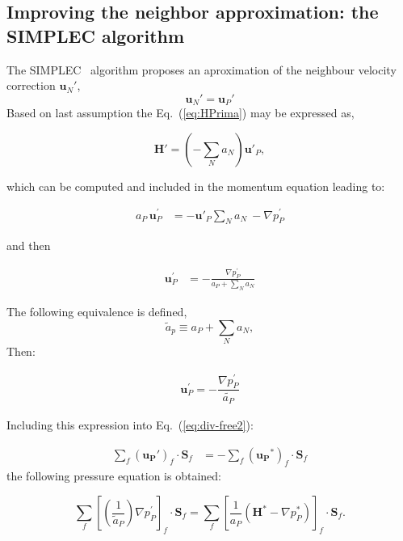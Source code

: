 \documentclass[final,3p,times,10pt,onecolumn]{myElsarticle}
\numberwithin{equation}{section}
\begin{document}
\subsection{Improving the neighbor approximation: the SIMPLEC algorithm}
The SIMPLEC~\cite{vanDoormal} algorithm proposes an aproximation of the neighbour velocity correction $\boldsymbol{u}_N'$,
\begin{equation}
\label{Eq:simplecAproximation}
\boldsymbol{u}_N'
=
\boldsymbol{u}_P'
\end{equation}
Based on last assumption the Eq.~(\ref{eq:HPrima}) may be expressed as,

\begin{equation}\label{eq:H_SIMPLEC}
\boldsymbol{H}'= \left(-\sum_N a_N\right) \boldsymbol{u}'_P,
\end{equation}

\noindent which can be computed and included in the momentum equation leading to:

\begin{align}\label{eq:uPrimeSIMPLEC}
a_P\,\boldsymbol{u}_P^{'} &= -\boldsymbol{u}'_P \sum_{N} a_{N}\ - \nabla p_P^{'}
\end{align}

\noindent and then

\begin{align}\label{eq:uPrimeSIMPLEC2}
 \boldsymbol{u}_P^{'} &= - \frac{\nabla p_P^{'}}{a_P + \sum_{N} a_{N}}
\end{align}


The following equivalence is defined,
\begin{equation}
\tilde{a}_p 
\equiv
a_P + \sum_{N} a_{N},
\end{equation}
Then:

\begin{align}\label{eq:uPrimeSIMPLEC2}
\boldsymbol{u}_P^{'} 
=
- 
\dfrac
{
\nabla p_P^{'}
}
{
\tilde{a_P}
}
\end{align}

Including this expression into Eq.~(\ref{eq:div-free2}):

\begin{align} 
\sum_f \left(\boldsymbol{u_P}'\right)_{f} \cdot \boldsymbol{S}_f &= -\sum_f \left(\boldsymbol{u_P}^{*}\right)_{f} \cdot \boldsymbol{S}_f \label{eq:div-free4}
\end{align}
\noindent the following pressure equation is obtained:

\begin{equation}
\label{eq:pEqnSIMPLEC1}
\sum_f 
\left[
\left(
\frac
{
1
}
{
\tilde{a}_P
}
\right)
\nabla p_P^{'}
\right]_f
\cdot 
\boldsymbol{S}_f
= 
\sum_f 
\left[
\frac{1}{a_P}
\left(
\boldsymbol{H}^* - \nabla p_P^{*}
\right)
\right]_f 
\cdot
\boldsymbol{S}_f.
\end{equation}
\end{document}
